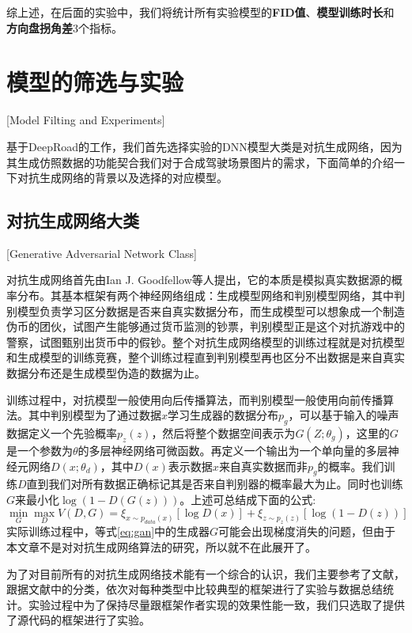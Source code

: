 综上述，在后面的实验中，我们将统计所有实验模型的\textbf{FID值}、\textbf{模型训练时长}和\textbf{方向盘拐角差}3个指标。


\section{模型的筛选与实验}[Model Filting and Experiments]

基于DeepRoad的工作，我们首先选择实验的DNN模型大类是对抗生成网络\cite{GAN}，因为其生成仿照数据的功能契合我们对于合成驾驶场景图片的需求，下面简单的介绍一下对抗生成网络的背景以及选择的对应模型。


\subsection{对抗生成网络大类}[Generative Adversarial Network Class]

对抗生成网络\cite{GAN}首先由Ian J. Goodfellow等人提出，它的本质是模拟真实数据源的概率分布。其基本框架有两个神经网络组成：生成模型网络和判别模型网络，其中判别模型负责学习区分数据是否来自真实数据分布，而生成模型可以想象成一个制造伪币的团伙，试图产生能够通过货币监测的钞票，判别模型正是这个对抗游戏中的警察，试图甄别出货币中的假钞。整个对抗生成网络模型的训练过程就是对抗模型和生成模型的训练竞赛，整个训练过程直到判别模型再也区分不出数据是来自真实数据分布还是生成模型伪造的数据为止。

训练过程中，对抗模型一般使用向后传播算法，而判别模型一般使用向前传播算法。其中判别模型为了通过数据$x$学习生成器的数据分布$p_g$，可以基于输入的噪声数据定义一个先验概率$p_z(z)$，然后将整个数据空间表示为$G(Z;\theta_g)$，这里的$G$是一个参数为$\theta$的多层神经网络可微函数。再定义一个输出为一个单向量的多层神经元网络$D(x;\theta_d)$，其中$D(x)$表示数据$x$来自真实数据而非$p_g$的概率。我们训练$D$直到我们对所有数据正确标记其是否来自判别器的概率最大为止。同时也训练$G$来最小化$\log(1-D(G(z)))$。上述可总结成下面的公式:
\begin{equation}
    \label{eq:gan}
    \min_G\max_DV(D,G)=\xi_{x\sim p_{data}(x)}[\log D(x)]+\xi_{z\sim p_z(z)}[\log(1-D(z))]
\end{equation}
实际训练过程中，等式\eqref{eq:gan}中的生成器$G$可能会出现梯度消失的问题，但由于本文章不是对对抗生成网络算法的研究，所以就不在此展开了。

为了对目前所有的对抗生成网络技术能有一个综合的认识，我们主要参考了文献\cite{gan-survey}，跟据文献中的分类，依次对每种类型中比较典型的框架进行了实验与数据总结统计。实验过程中为了保持尽量跟框架作者实现的效果性能一致，我们只选取了提供了源代码的框架进行了实验。

